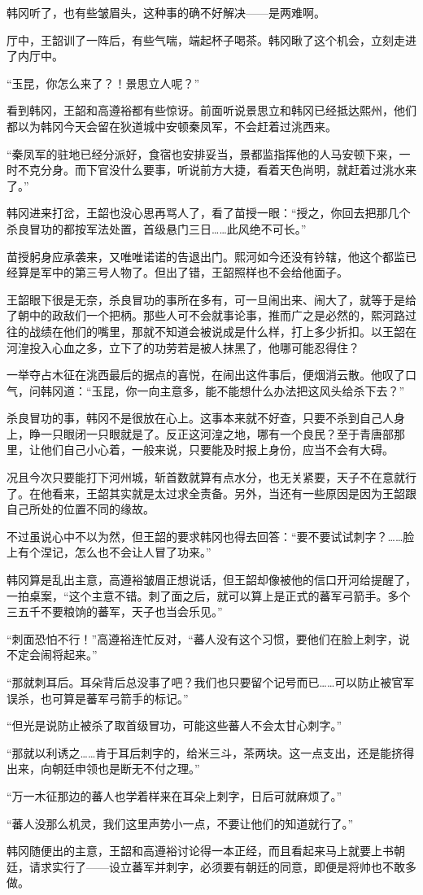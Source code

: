 韩冈听了，也有些皱眉头，这种事的确不好解决——是两难啊。

厅中，王韶训了一阵后，有些气喘，端起杯子喝茶。韩冈瞅了这个机会，立刻走进了内厅中。

“玉昆，你怎么来了？！景思立人呢？”

看到韩冈，王韶和高遵裕都有些惊讶。前面听说景思立和韩冈已经抵达熙州，他们都以为韩冈今天会留在狄道城中安顿秦凤军，不会赶着过洮西来。

“秦凤军的驻地已经分派好，食宿也安排妥当，景都监指挥他的人马安顿下来，一时不克分身。而下官没什么要事，听说前方大捷，看着天色尚明，就赶着过洮水来了。”

韩冈进来打岔，王韶也没心思再骂人了，看了苗授一眼：“授之，你回去把那几个杀良冒功的都按军法处置，首级悬门三日……此风绝不可长。”

苗授躬身应承袭来，又唯唯诺诺的告退出门。熙河如今还没有钤辖，他这个都监已经算是军中的第三号人物了。但出了错，王韶照样也不会给他面子。

王韶眼下很是无奈，杀良冒功的事所在多有，可一旦闹出来、闹大了，就等于是给了朝中的政敌们一个把柄。那些人可不会就事论事，推而广之是必然的，熙河路过往的战绩在他们的嘴里，那就不知道会被说成是什么样，打上多少折扣。以王韶在河湟投入心血之多，立下了的功劳若是被人抹黑了，他哪可能忍得住？

一举夺占木征在洮西最后的据点的喜悦，在闹出这件事后，便烟消云散。他叹了口气，问韩冈道：“玉昆，你一向主意多，能不能想什么办法把这风头给杀下去？”

杀良冒功的事，韩冈不是很放在心上。这事本来就不好查，只要不杀到自己人身上，睁一只眼闭一只眼就是了。反正这河湟之地，哪有一个良民？至于青唐部那里，让他们自己小心着，一般来说，只要能及时报上身份，应当不会有大碍。

况且今次只要能打下河州城，斩首数就算有点水分，也无关紧要，天子不在意就行了。在他看来，王韶其实就是太过求全责备。另外，当还有一些原因是因为王韶跟自己所处的位置不同的缘故。

不过虽说心中不以为然，但王韶的要求韩冈也得去回答：“要不要试试刺字？……脸上有个涅记，怎么也不会让人冒了功来。”

韩冈算是乱出主意，高遵裕皱眉正想说话，但王韶却像被他的信口开河给提醒了，一拍桌案，“这个主意不错。刺了面之后，就可以算上是正式的蕃军弓箭手。多个三五千不要粮饷的蕃军，天子也当会乐见。”

“刺面恐怕不行！”高遵裕连忙反对，“蕃人没有这个习惯，要他们在脸上刺字，说不定会闹将起来。”

“那就刺耳后。耳朵背后总没事了吧？我们也只要留个记号而已……可以防止被官军误杀，也可算是蕃军弓箭手的标记。”

“但光是说防止被杀了取首级冒功，可能这些蕃人不会太甘心刺字。”

“那就以利诱之……肯于耳后刺字的，给米三斗，茶两块。这一点支出，还是能挤得出来，向朝廷申领也是断无不付之理。”

“万一木征那边的蕃人也学着样来在耳朵上刺字，日后可就麻烦了。”

“蕃人没那么机灵，我们这里声势小一点，不要让他们的知道就行了。”

韩冈随便出的主意，王韶和高遵裕讨论得一本正经，而且看起来马上就要上书朝廷，请求实行了——设立蕃军并刺字，必须要有朝廷的同意，即便是将帅也不敢多做。

